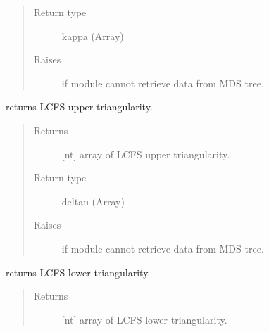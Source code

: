 \documentclass[letterpaper,10pt,english]{sphinxmanual}
\begin{document}
\begin{fulllineitems}
\begin{fulllineitems}
\begin{quote}
\begin{description}
\item[{Return type}] \leavevmode
kappa (Array)

\item[{Raises}] \leavevmode
{} \textendash{} if module cannot retrieve data from MDS tree.

\end{description}\end{quote}

\end{fulllineitems}


\begin{fulllineitems}
\label{\detokenize{eqtools:eqtools.TCVLIUQE.TCVLIUQETree.getUpperTriangularity}}
returns LCFS upper triangularity.
\begin{quote}\begin{description}
\item[{Returns}] \leavevmode
{[}nt{]} array of LCFS upper triangularity.

\item[{Return type}] \leavevmode
deltau (Array)

\item[{Raises}] \leavevmode
{} \textendash{} if module cannot retrieve data from MDS tree.

\end{description}\end{quote}

\end{fulllineitems}


\begin{fulllineitems}
\label{\detokenize{eqtools:eqtools.TCVLIUQE.TCVLIUQETree.getLowerTriangularity}}
returns LCFS lower triangularity.
\begin{quote}\begin{description}
\item[{Returns}] \leavevmode
{[}nt{]} array of LCFS lower triangularity.


\end{description}
\end{quote}
\end{fulllineitems}
\end{fulllineitems}
\end{document}
